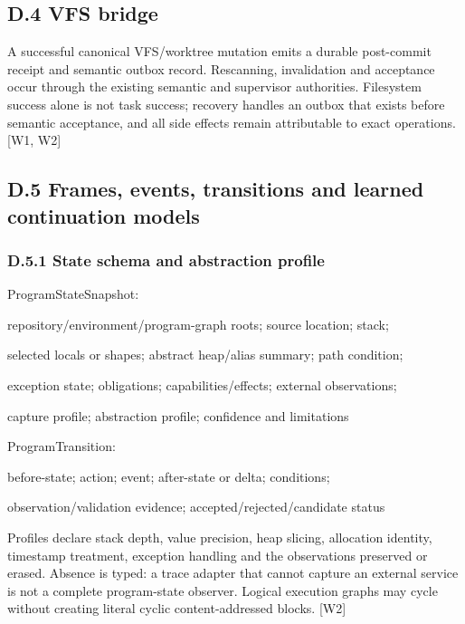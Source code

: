 \documentclass{article}
\begin{document}
\subsection*{D.4 VFS bridge}

A successful canonical VFS/worktree mutation emits a durable post-commit receipt and semantic
outbox record. Rescanning, invalidation and acceptance occur through the existing semantic and
supervisor authorities. Filesystem success alone is not task success; recovery handles an outbox that
exists before semantic acceptance, and all side effects remain attributable to exact operations. [W1,
W2]




\subsection*{D.5 Frames, events, transitions and learned continuation models}

\subsubsection*{D.5.1 State schema and abstraction profile}

\noindent ProgramStateSnapshot:\par
\noindent repository/environment/program-graph roots; source location; stack;\par
\noindent selected locals or shapes; abstract heap/alias summary; path condition;\par
\noindent exception state; obligations; capabilities/effects; external observations;\par
\noindent capture profile; abstraction profile; confidence and limitations\par
\noindent ProgramTransition:\par
\noindent before-state; action; event; after-state or delta; conditions;\par
\noindent observation/validation evidence; accepted/rejected/candidate status\par

Profiles declare stack depth, value precision, heap slicing, allocation identity, timestamp treatment,
exception handling and the observations preserved or erased. Absence is typed: a trace adapter that
cannot capture an external service is not a complete program-state observer. Logical execution graphs
may cycle without creating literal cyclic content-addressed blocks. [W2]
\end{document}

